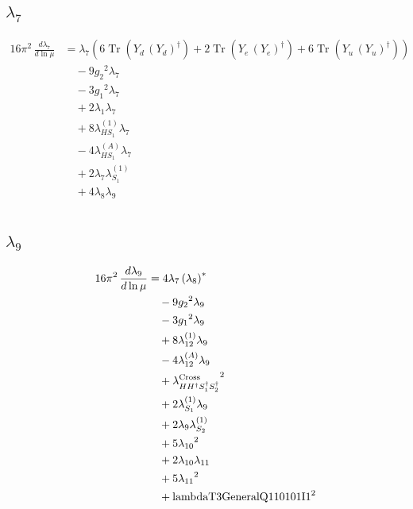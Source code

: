 \documentclass[10pt,a4paper]{article}
\begin{document}
\subsection*{$\lambda_{7}$}
\begin{align*}
16\pi^2\,\frac{d \lambda_{7}}{d\ln\mu} &={\lambda_{7}} (6 \operatorname{Tr}\!\left({Y_d}\,\left({Y_d}\right)^{\dagger}\right)+2 \operatorname{Tr}\!\left({Y_e}\,\left({Y_e}\right)^{\dagger}\right)+6 \operatorname{Tr}\!\left({Y_u}\,\left({Y_u}\right)^{\dagger}\right)) \\
&\quad -9 {g_2}^2 {\lambda_{7}} \\
&\quad -3 {g_1}^2 {\lambda_{7}} \\
&\quad +2 {\lambda_1} {\lambda_{7}} \\
&\quad +8 {\lambda_{HS_1}^{(1)}} {\lambda_{7}} \\
&\quad -4 {\lambda_{HS_1}^{(A)}} {\lambda_{7}} \\
&\quad +2 {\lambda_{7}} {\lambda_{S_1}^{(1)}} \\
&\quad +4 {\lambda_{8}} {\lambda_{9}} \\
\end{align*}
\subsection*{$\lambda_{9}$}
\begin{align*}
16\pi^2\,\frac{d \lambda_{9}}{d\ln\mu} &=4 {\lambda_{7}} \left({\lambda_{8}}\right)^{*} \\
&\quad -9 {g_2}^2 {\lambda_{9}} \\
&\quad -3 {g_1}^2 {\lambda_{9}} \\
&\quad +8 {\lambda_{12}^{(1)}} {\lambda_{9}} \\
&\quad -4 {\lambda_{12}^{(A)}} {\lambda_{9}} \\
&\quad +{\lambda_{H H^\dagger S_1^\dagger S_2^\dagger}^{\rm Cross}}^2 \\
&\quad +2 {\lambda_{S_1}^{(1)}} {\lambda_{9}} \\
&\quad +2 {\lambda_{9}} {\lambda_{S_2}^{(1)}} \\
&\quad +5 {\lambda_{10}}^2 \\
&\quad +2 {\lambda_{10}} {\lambda_{11}} \\
&\quad +5 {\lambda_{11}}^2 \\
&\quad +\text{lambdaT3GeneralQ110101I1}^2 \\
\end{align*}
\end{document}
